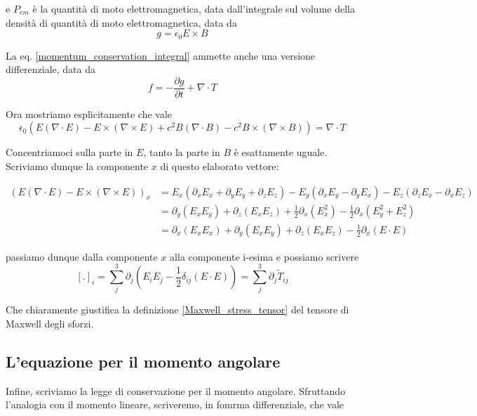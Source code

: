 \documentclass{report}
\begin{document}
e $P_{em}$ è la quantità di moto elettromagnetica, data dall'integrale sul volume della densità di quantità di moto elettromagnetica, data da 
\begin{equation}
    g = \epsilon_0 E \times B
\end{equation}

La eq. \ref{momentum_conservation_integral} ammette anche una versione differenziale, data da 
\begin{equation}
    f = -\frac{\partial g}{\partial t} + \nabla \cdot T
\end{equation}

Ora mostriamo esplicitamente che vale 
\begin{equation}
    \epsilon_0(E(\nabla\cdot E) - E\times (\nabla \times E) +c^2 B(\nabla \cdot B)- c^2 B \times (\nabla \times B)) = \nabla \cdot T
\end{equation}

Concentriamoci sulla parte in $E$, tanto la parte in $B$ è esattamente uguale. Scriviamo dunque la componente $x$ di questo elaborato vettore: 

\begin{align}
    (E(\nabla\cdot E) - E\times (\nabla \times E))_x &= E_x(\partial_xE_x + \partial_yE_y + \partial_zE_z) - E_y(\partial_xE_y - \partial_yE_x) - E_z(\partial_zE_x - \partial_x E_z) \\
    &= \partial_y(E_xE_y) + \partial_z(E_xE_z) + \frac{1}{2}\partial_x(E_x^2) - \frac{1}{2}\partial_x(E_y^2 + E_z^2) \\
    &= \partial_x (E_xE_x) + \partial_y(E_xE_y) + \partial_z(E_xE_z) - \frac{1}{2}\partial_x(E \cdot E)
\end{align}

passiamo dunque dalla componente $x$ alla componente i-esima e possiamo scrivere 
\begin{equation}
    \left[. \right]_i = \sum_j^3 \partial_j (E_iE_j - \frac{1}{2}\delta_{ij}(E\cdot E)) = \sum_j^3 \partial_j \tilde{T}_{ij}
\end{equation}

Che chiaramente giustifica la definizione \ref{Maxwell_stress_tensor} del tensore di Maxwell degli sforzi.

\subsection{L'equazione per il momento angolare}

Infine, scriviamo la legge di conservazione per il momento angolare. Sfruttando l'analogia con il momento lineare, scriveremo, in fomrma differenziale, che vale 
\end{document}
